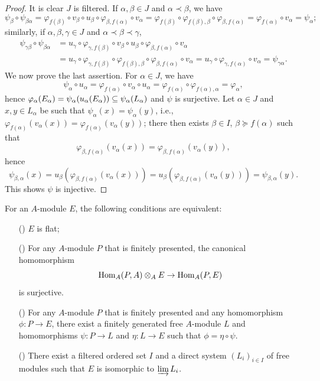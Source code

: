 \begin{proof}
It is clear $J$ is filtered. If $\alpha,\beta\in J$ and $\alpha\prec\beta$, we have
\[\psi_\beta\circ\psi_{\beta\alpha}=\varphi_{f(\beta)}\circ v_\beta\circ u_\beta\circ\varphi_{\beta,f(\alpha)}\circ v_\alpha=\varphi_{f(\beta)}\circ\varphi_{f(\beta),\beta}\circ\varphi_{\beta,f(\alpha)}=\varphi_{f(\alpha)}\circ v_\alpha=\psi_\alpha;\]
similarly, if $\alpha,\beta,\gamma\in J$ and $\alpha\prec\beta\prec\gamma$,
\begin{align*}
\psi_{\gamma\beta}\circ\psi_{\beta\alpha}&=u_\gamma\circ\varphi_{\gamma,f(\beta)}\circ v_\beta\circ u_\beta\circ\varphi_{\beta,f(\alpha)}\circ v_\alpha\\
&=u_\gamma\circ\varphi_{\gamma,f(\beta)}\circ\varphi_{f(\beta),\beta}\circ\varphi_{\beta,f(\alpha)}\circ v_\alpha=u_\gamma\circ\varphi_{\gamma,f(\alpha)}\circ v_\alpha=\psi_{\gamma\alpha}.
\end{align*}
We now prove the last assertion. For $\alpha\in J$, we have
\[\psi_\alpha\circ u_\alpha=\varphi_{f(\alpha)}\circ v_\alpha\circ u_\alpha=\varphi_{f(\alpha)}\circ\varphi_{f(\alpha),\alpha}=\varphi_\alpha,\]
hence $\varphi_\alpha(E_\alpha)=\psi_\alpha(u_\alpha(E_\alpha))\subseteq\psi_\alpha(L_\alpha)$ and $\psi$ is surjective. Let $\alpha\in J$ and $x,y\in L_\alpha$ be such that $\psi_\alpha(x)=\psi_\alpha(y)$, i.e., $\varphi_{f(\alpha)}(v_\alpha(x))=\varphi_{f(\alpha)}(v_\alpha(y))$; there then exists $\beta\in I$, $\beta\succeq f(\alpha)$ such that 
\[\varphi_{\beta,f(\alpha)}(v_\alpha(x))=\varphi_{\beta,f(\alpha)}(v_\alpha(y)),\]
hence
\[\psi_{\beta,\alpha}(x)=u_\beta(\varphi_{\beta,f(\alpha)}(v_\alpha(x)))=u_\beta(\varphi_{\beta,f(\alpha)}(v_\alpha(y)))=\psi_{\beta,\alpha}(y).\]
This shows $\psi$ is injective.
\end{proof}
\begin{theorem}\label{module flat iff direct limit}
For an $A$-module $E$, the following conditions are equivalent:
\begin{itemize}
\item[(\rmnum{1})] $E$ is flat;
\item[(\rmnum{2})] For any $A$-module $P$ that is finitely presented, the canonical homomorphism
\[\mathrm{Hom}_A(P,A)\otimes_AE\to\mathrm{Hom}_A(P,E)\]
is surjective.
\item[(\rmnum{3})] For any $A$-module $P$ that is finitely presented and any homomorphism $\phi:P\to E$, there exist a finitely generated free $A$-module $L$ and homomorphisms $\psi:P\to L$ and $\eta:L\to E$ such that $\phi=\eta\circ\psi$.
\item[(\rmnum{4})] There exist a filtered ordered set $I$ and a direct system $(L_i)_{i\in I}$ of free modules such that $E$ is isomorphic to $\varinjlim L_i$. 
\end{itemize}
\end{theorem}
